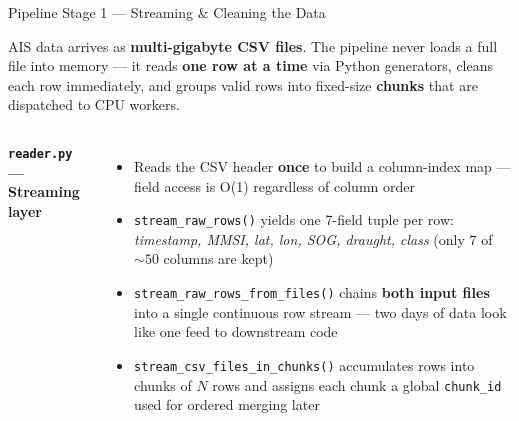 \documentclass[svgnames, 9pt]{beamer}
\begin{document}
\begin{frame}{Pipeline Stage 1 — Streaming \& Cleaning the Data}
    \footnotesize

    AIS data arrives as \textbf{multi-gigabyte CSV files}. The pipeline never
    loads a full file into memory — it reads \textbf{one row at a time} via
    Python generators, cleans each row immediately, and groups valid rows into
    fixed-size \textbf{chunks} that are dispatched to CPU workers.

    \vspace{0.4em}
    \begin{columns}[T]

        {\scriptsize\color{maincolor}\textbf{\texttt{reader.py} — Streaming layer}}
        \vspace{0.15em}
        \begin{itemize}\scriptsize
            \item Reads the CSV header \textbf{once} to build a column-index
                  map — field access is O(1) regardless of column order
            \item \texttt{stream\_raw\_rows()} yields one 7-field tuple per
                  row: \textit{timestamp, MMSI, lat, lon, SOG, draught, class}
                  (only 7 of ${\sim}50$ columns are kept)
            \item \texttt{stream\_raw\_rows\_from\_files()} chains \textbf{both
                  input files} into a single continuous row stream — two days
                  of data look like one feed to downstream code
            \item \texttt{stream\_csv\_files\_in\_chunks()} accumulates rows
                  into chunks of $N$ rows and assigns each chunk a global
                  \texttt{chunk\_id} used for ordered merging later
        \end{itemize}


\end{columns}
\end{frame}
\end{document}
